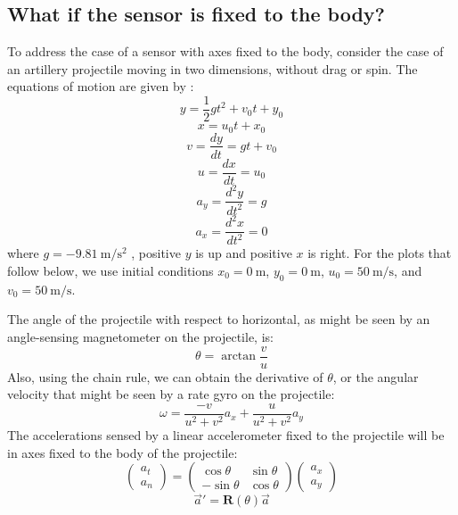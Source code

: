 \documentclass{amsart}
\begin{document}
\subsection{What if the sensor is fixed to the body?}
\label{sec:projectile}
To address the case of a sensor with axes fixed to the body, consider the case of an artillery projectile moving in two dimensions, without drag or spin.  The equations of motion are given by \cite{Galileo:1638, Newton:1687}:
\begin{equation}
y = \frac{1}{2}gt^2 + v_0 t + y_0
\end{equation}
\begin{equation}
x = u_0 t + x_0
\end{equation}
\begin{equation}
v = \frac{dy}{dt} = gt + v_0
\end{equation}
\begin{equation}
u = \frac{dx}{dt} = u_0
\end{equation}
\begin{equation}
a_y = \frac{d^2y}{dt^2} = g
\end{equation}
\begin{equation}
a_x = \frac{d^2x}{dt^2} = 0
\end{equation}
where $g=\SI{-9.81}{\meter\per\second\squared}$ \cite{Newton:1687}, positive $y$ is up and positive $x$ is right.  For the plots that follow below, we use initial conditions $x_0=\SI{0}{\meter}$, $y_0=\SI{0}{\meter}$, $u_0=\SI{50}{\meter\per\second}$, and $v_0=\SI{50}{\meter\per\second}$.  

The angle of the projectile with respect to horizontal, as might be seen by an angle-sensing magnetometer on the projectile, is:
\begin{equation}
\theta = \arctan{\frac{v}{u}}
\end{equation}
Also, using the chain rule, we can obtain the derivative of $\theta$, or the angular velocity that might be seen by a rate gyro on the projectile:
\begin{equation}
\omega = \frac{-v}{u^2+v^2}a_x + \frac{u}{u^2+v^2}a_y
\end{equation}
The accelerations sensed by a linear accelerometer fixed to the projectile will be in axes fixed to the body of the projectile:
\begin{equation}
\begin{pmatrix} a_t \\ a_n \end{pmatrix}
=
\begin{pmatrix}
\cos{\theta} & \sin{\theta} \\
-\sin{\theta} & \cos{\theta}
\end{pmatrix}
\begin{pmatrix} a_x \\ a_y \end{pmatrix}
\end{equation}
\begin{equation}
\vec{a}' = \mathbf{R}(\theta) \vec{a}
\end{equation}
\end{document}
